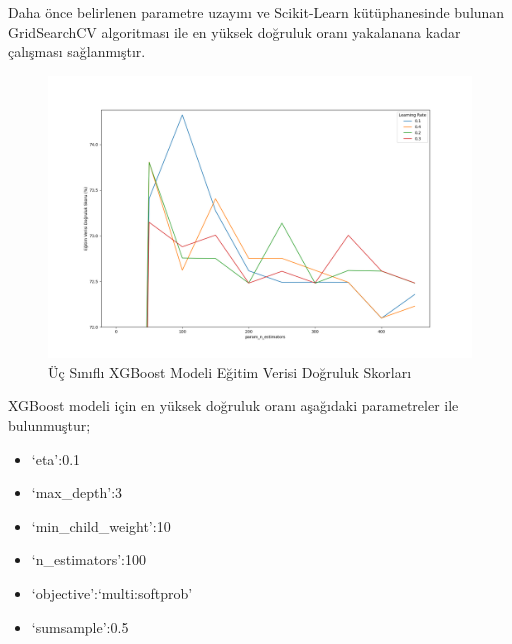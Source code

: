 \documentclass[12pt,twoside]{deuthesis}
\providecommand{\tightlist}{%
  \setlength{\itemsep}{0pt}\setlength{\parskip}{0pt}}
\begin{document}
Daha önce belirlenen parametre uzayını ve Scikit-Learn kütüphanesinde bulunan GridSearchCV algoritması ile en yüksek doğruluk oranı yakalanana kadar çalışması sağlanmıştır.
\begin{figure}

{\centering \includegraphics[width=1.1\linewidth,height=0.5\textheight]{figure/XGB_Grid_Graph} 

}

\caption{Üç Sınıflı XGBoost Modeli Eğitim Verisi Doğruluk Skorları}\label{fig:unnamed-chunk-35}
\end{figure}
XGBoost modeli için en yüksek doğruluk oranı aşağıdaki parametreler ile bulunmuştur;
\begin{itemize}
\tightlist
\item
  `eta':0.1
\item
  `max\_depth':3
\item
  `min\_child\_weight':10
\item
  `n\_estimators':100
\item
  `objective':`multi:softprob'
\item
  `sumsample':0.5
\end{itemize}
\newpage
\end{document}

